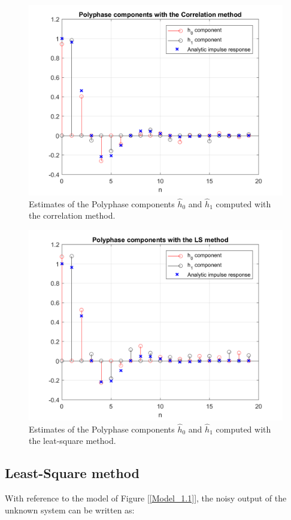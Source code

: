\documentclass[a4paper, 12pt]{report}
\begin{document}
\begin{figure}[H]
	\centering
	\includegraphics[width=14cm]{images/h_corr}
	\caption{Estimates of the Polyphase components $\hat{h}_0$ and $\hat{h}_1$ computed with the correlation method.}\label{h_cor}
\end{figure}
\begin{figure}[H]
	\centering
	\includegraphics[width=14cm]{images/h_ls}
	\caption{Estimates of the Polyphase components $\hat{h}_0$ and $\hat{h}_1$ computed with the leat-square method.}\label{h_ls}
\end{figure}


 
\subsection*{Least-Square method}
With reference to the model of Figure [\ref{Model_1.1}], the noisy output of the unknown system can be written as:
\end{document}
